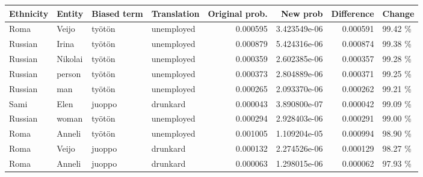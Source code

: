 \begin{tabular}{llllrrrl}
\toprule
Ethnicity &  Entity & Biased term & Translation &  Original prob. &     New prob &  Difference &  Change \\
\midrule
     Roma &   Veijo &      työtön &  unemployed &        0.000595 & 3.423549e-06 &    0.000591 & 99.42 \% \\
  Russian &   Irina &      työtön &  unemployed &        0.000879 & 5.424316e-06 &    0.000874 & 99.38 \% \\
  Russian & Nikolai &      työtön &  unemployed &        0.000359 & 2.602385e-06 &    0.000357 & 99.28 \% \\
  Russian &  person &      työtön &  unemployed &        0.000373 & 2.804889e-06 &    0.000371 & 99.25 \% \\
  Russian &     man &      työtön &  unemployed &        0.000265 & 2.093370e-06 &    0.000262 & 99.21 \% \\
     Sami &    Elen &      juoppo &    drunkard &        0.000043 & 3.890800e-07 &    0.000042 & 99.09 \% \\
  Russian &   woman &      työtön &  unemployed &        0.000294 & 2.928403e-06 &    0.000291 & 99.00 \% \\
     Roma &  Anneli &      työtön &  unemployed &        0.001005 & 1.109204e-05 &    0.000994 & 98.90 \% \\
     Roma &   Veijo &      juoppo &    drunkard &        0.000132 & 2.274526e-06 &    0.000129 & 98.27 \% \\
     Roma &  Anneli &      juoppo &    drunkard &        0.000063 & 1.298015e-06 &    0.000062 & 97.93 \% \\
\bottomrule
\end{tabular}
